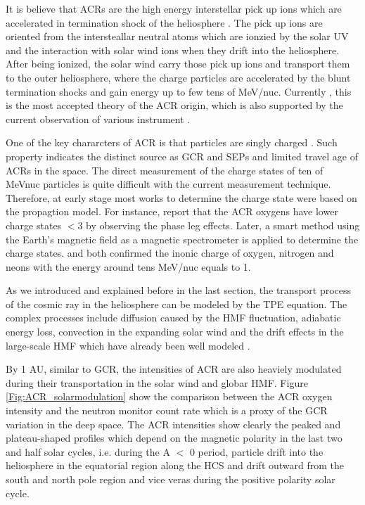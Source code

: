 It is believe that ACRs are the high energy interstellar pick up ions which are accelerated in termination shock of the heliosphere \citet{Fisk1974ApJ}. The pick up ions are oriented from the intersteallar neutral atoms which are ionzied by the solar UV and the interaction with solar wind ions when they drift into the heliosphere. After being ionized, the solar wind carry those pick up ions and transport them to the outer heliosphere, where the charge particles are accelerated by the blunt termination shocks \citet{McComas2006GeoRL} and gain energy up to few tens of MeV/nuc. Currently , this is the most accepted theory of the ACR origin, which is also supported by the current observation of various instrument \citet{McComas2019ApJ, Cummings2019ICRC}.

One of the key chararcters of \ac{ACR} is that particles are singly charged \citep{Klecker1980GeoRL,Adams1991ApJ, Klecker1995ApJ}. Such property indicates the distinct source as \ac{GCR} and \acp{SEP} and limited travel age of \acp{ACR} in the space. The direct measurement of the charge states of ten of MeV\/nuc particles is quite difficult with the current measurement technique. Therefore, at early stage most works to determine the charge state were based on the propagtion model. For instance, \citet{Klecker1980GeoRL} report that the \ac{ACR} oxygens have lower charge states $<$3 by observing the phase leg effects. Later, a smart method using the Earth's magnetic field as a magnetic spectrometer is applied to determine the charge states. \citet{Adams1991ApJ} and \citet{Klecker1995ApJ} both confirmed the inonic charge of oxygen, nitrogen and neons with the energy around tens MeV/nuc equals to 1.

As we introduced and explained before in the last section, the transport process of the cosmic ray in the heliosphere can be modeled by the TPE equation. The complex processes include diffusion caused by the \ac{HMF} fluctuation, adiabatic energy loss, convection in the expanding solar wind and the drift effects in the large-scale \ac{HMF} which have already been well modeled \citep{Parker1965Pss, Jokipii1977ApJ, Jokipii1981ApJ}.

By 1 AU, similar to \ac{GCR}, the intensities of \ac{ACR} are also heaviely modulated during their transportation in the solar wind and globar \ac{HMF}. Figure \ref{Fig:ACR_solarmodulation} show the comparison between the ACR oxygen intensity and the neutron monitor count rate which is a proxy of the GCR variation in the deep space. The \ac{ACR} intensities show clearly the peaked and plateau-shaped profiles which depend on the magnetic polarity in the last two and half solar cycles, i.e. during the A $<$ 0 period, particle drift into the heliosphere in the equatorial region along the \ac{HCS} and drift outward from the south and north pole region and vice veras during the positive polarity solar cycle.

